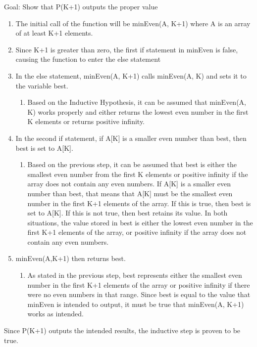 \documentclass[12pt]{article}
\begin{document}
Goal: Show that P(K+1) outputs the proper value
\begin{enumerate}
    \item The initial call of the function will be minEven(A, K+1) where A is an array of at least K+1 elements. 
    \item Since K+1 is greater than zero, the first if statement in minEven is false, causing the function to enter the else statement
    \item In the else statement, minEven(A, K+1) calls minEven(A, K) and sets it to the variable best.
    \begin{enumerate}
        \item  Based on the Inductive Hypothesis, it can be assumed that minEven(A, K) works properly and either returns
         the lowest even number in the first K elements or returns positive infinity. 
    \end{enumerate}
    \item In the second if statement, if A[K] is a smaller even number than best, then best is set to A[K]. 
    \begin{enumerate}
        \item Based on the previous step, it can be assumed that best is either the smallest even number from the first K elements or positive infinity if the 
        array does not contain any even numbers. If A[K] is a smaller even number than best, that means that A[K] must be the smallest even number in the first
         K+1 elements of the array. If this is true, then best is set to A[K]. If this is not true, then best retains its value. In both situations, the value stored 
         in best is either the lowest even number in the first K+1 elements of the array, or positive infinity if the array does not contain any even numbers. 
    \end{enumerate}
    \item  minEven(A,K+1) then returns best.
    \begin{enumerate}
        \item As stated in the previous step, best represents either the smallest even number in the first K+1 elements of the array or positive infinity if there were no even numbers in that range. 
        Since best is equal to the value that minEven is intended to output, it must be true that minEven(A, K+1) works as intended. 
    \end{enumerate}
\end{enumerate}

Since P(K+1) outputs the intended results, the inductive step is proven to be true. 
\end{document}
